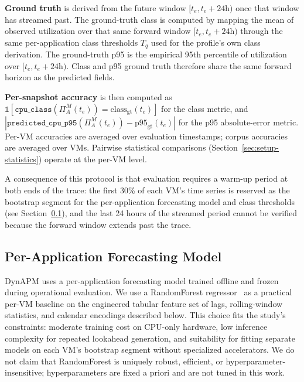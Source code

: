 \documentclass[manuscript,screen,review,anonymous]{acmart}
\begin{document}
\textbf{Ground truth} is derived from the future window
$[t_e, t_e + 24\mathrm{h})$ once that window has streamed past. The
ground-truth class is computed by mapping the mean of observed
utilization over that same forward window
$[t_e, t_e + 24\mathrm{h})$ through the same per-application class
thresholds $T_q$ used for the profile's own class derivation. The
ground-truth p95 is the empirical 95th percentile of utilization
over $[t_e, t_e + 24\mathrm{h})$. Class and p95 ground truth
therefore share the same forward horizon as the predicted fields.

\textbf{Per-snapshot accuracy} is then computed as
$\mathbb{1}[\texttt{cpu\_class}(\Pi^M_A(t_e)) =
\mathrm{class}_\mathrm{gt}(t_e)]$ for the class metric, and
$|\texttt{predicted\_cpu\_p95}(\Pi^M_A(t_e)) -
\mathrm{p95}_\mathrm{gt}(t_e)|$ for the p95 absolute-error metric.
Per-VM accuracies are averaged over evaluation timestamps; corpus
accuracies are averaged over VMs. Pairwise statistical
comparisons (Section~\ref{sec:setup-statistics}) operate at the
per-VM level.

A consequence of this protocol is that evaluation requires a
warm-up period at both ends of the trace: the first 30\% of each
VM's time series is reserved as the bootstrap segment for the
per-application forecasting model and class thresholds (see
Section~\ref{sec:framework-forecaster}), and the last 24 hours of
the streamed period cannot be verified because the forward window
extends past the trace.

\subsection{Per-Application Forecasting Model}\label{sec:framework-forecaster}

DynAPM uses a per-application forecasting model trained offline
and frozen during operational evaluation. We use a RandomForest
regressor~\cite{breiman_random_forests_2001} as a practical
per-VM baseline on the engineered tabular feature set of lags,
rolling-window statistics, and calendar encodings described below.
This choice fits the study's constraints: moderate training cost
on CPU-only hardware, low inference complexity for repeated
lookahead generation, and suitability for fitting separate models
on each VM's bootstrap segment without specialized accelerators.
We do not claim that RandomForest is uniquely robust, efficient,
or hyperparameter-insensitive; hyperparameters are fixed a priori
and are not tuned in this work.
\end{document}

